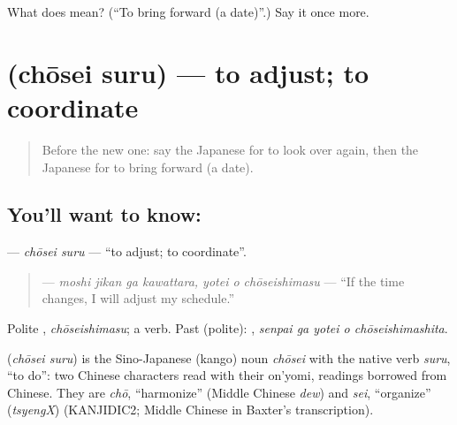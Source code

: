 \begin{tcolorbox}[breakable,colback=teal!4,colframe=teal!35!black,title={Before you move on}]
What does  mean? (\textquotedblleft{}To bring forward (a date)\textquotedblright{}.) Say it once more.
\end{tcolorbox}
\section[\texorpdfstring{\ja{ちょうせいする} (chōsei suru)}{ちょうせいする (chōsei suru)}]{ (chōsei suru) — to adjust; to coordinate}

\label{lesson:JA-C513-chousei-suru}



\begin{quote}
Before the new one: say the Japanese for to look over again, then the Japanese for to bring forward (a date).
\end{quote}

\subsection*{You'll want to know: }
\textbf{} — \emph{chōsei suru} — \textquotedblleft{}to adjust; to coordinate\textquotedblright{}.

\begin{quote}
\textbf{   } — \emph{moshi jikan ga kawattara, yotei o chōseishimasu} — \textquotedblleft{}If the time changes, I will adjust my schedule.\textquotedblright{}
\end{quote}

Polite \textbf{}, \emph{chōseishimasu}; a  verb. Past (polite): \textbf{  }, \emph{senpai ga yotei o chōseishimashita}.

\begin{cousinweb}
\textbf{} (\emph{chōsei suru}) is the Sino-Japanese (kango) noun \emph{chōsei} with the native verb \emph{suru}, \textquotedblleft{}to do\textquotedblright{}: two Chinese characters read with their on'yomi, readings borrowed from Chinese. They are \emph{chō}, \textquotedblleft{}harmonize\textquotedblright{} (Middle Chinese \emph{dew}) and \emph{sei}, \textquotedblleft{}organize\textquotedblright{} (\emph{tsyengX}) (KANJIDIC2; Middle Chinese in Baxter's transcription).
\end{cousinweb}

